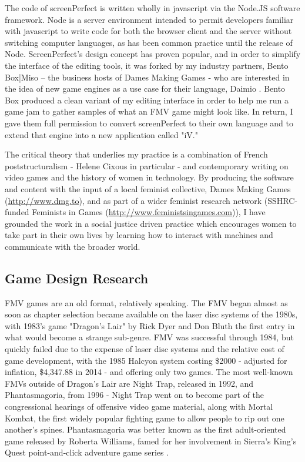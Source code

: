 The code of screenPerfect is written wholly in javascript via the Node.JS software framework. Node is a server environment intended to permit developers familiar with javascript to write code for both the browser client and the server without switching computer languages, as has been common practice until the release of Node. ScreenPerfect's design concept has proven popular, and in order to simplify the interface of the editing tools, it was forked by my industry partners, Bento Box|Miso – the business hosts of Dames Making Games - who are interested in the idea of new game engines as a use case for their language, Daimio \parencite{daimio}. Bento Box produced a clean variant of my editing interface in order to help me run a game jam to gather samples of what an FMV game might look like. In return, I gave them full permission to convert screenPerfect to their own language and to extend that engine into a new application called "iV." 

The critical theory that underlies my practice is a combination of French poststructuralism - Helene Cixous in particular - and contemporary writing on video games and the history of women in technology. By producing the software and content with the input of a local feminist collective, Dames Making Games (\url{http://www.dmg.to}), and as part of a wider feminist research network (SSHRC-funded Feminists in Games (\url{http://www.feministsingames.com})), I have grounded the work in a social justice driven practice which encourages women to take part in their own lives by learning how to interact with machines and communicate with the broader world.

\subsection{Game Design Research}
FMV games are an old format, relatively speaking. The FMV began almost as soon as chapter selection became available on the laser disc systems of the 1980s, with 1983's game "Dragon's Lair" by Rick Dyer and Don Bluth the first entry in what would become a strange sub-genre. FMV was successful through 1984, but quickly failed due to the expense of laser disc systems and the relative cost of game development, with the 1985 Halcyon system costing \$2000 - adjusted for inflation, \$4,347.88 in 2014 - and offering only two games. The most well-known FMVs outside of Dragon's Lair are Night Trap, released in 1992, and Phantasmagoria, from 1996 - Night Trap went on to become part of the congressional hearings of offensive video game material, along with Mortal Kombat, the first widely popular fighting game to allow people to rip out one another's spines. Phantasmagoria was better known as the first adult-oriented game released by Roberta Williams, famed for her involvement in Sierra's King's Quest point-and-click adventure game series \parencite{encyclopediavideogame}.


